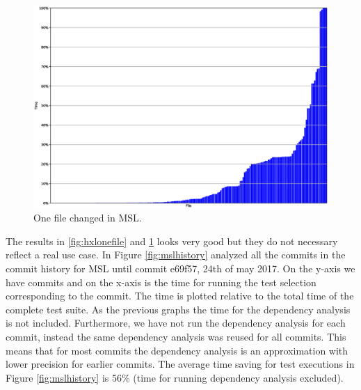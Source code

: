 \documentclass{cslthse-msc}
\begin{document}
\begin{figure}[!htbp]
    \centering
    \includegraphics[width=\textwidth]{Graphs/MSL_one_file.eps}
    \caption{One file changed in MSL.}
    \label{fig:mslonefile}
\end{figure}

The results in \ref{fig:hxlonefile} and \ref{fig:mslonefile} looks very good but they do not necessary reflect a real use case. In Figure \ref{fig:mslhistory} analyzed all the commits in the commit history for MSL until commit e69f57, 24th of may 2017. On the y-axis we have commits and on the x-axis is the time for running the test selection corresponding to the commit. The time is plotted relative to the total time of the complete test suite. As the previous graphs the time for the dependency analysis is not included. Furthermore, we have not run the dependency analysis for each commit, instead the same dependency analysis was reused for all commits. This means that for most commits the dependency analysis is an approximation with lower precision for earlier commits. The average time saving for test executions in Figure \ref{fig:mslhistory} is 56\% (time for running dependency analysis excluded).
\end{document}
